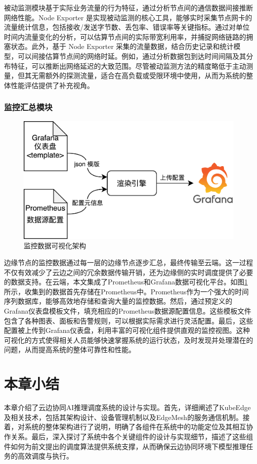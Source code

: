 被动监测模块基于实际业务流量的行为特征，通过分析节点间的通信数据间接推断网络性能。Node Exporter 是实现被动监测的核心工具，能够实时采集节点网卡的流量统计信息，包括接收/发送字节数、丢包率、错误率等关键指标。通过对单位时间内流量变化的分析，可以估算节点间的实际带宽利用率，并捕捉网络链路的拥塞状态。此外，基于 Node Exporter 采集的流量数据，结合历史记录和统计模型，可以间接估算节点间的网络时延。例如，通过分析数据包到达时间间隔及其分布特征，可以推断出网络延迟的大致范围。尽管被动监测方法的精度略低于主动测量，但其无需额外的探测流量，适合在高负载或受限环境中使用，从而为系统的整体性能评估提供了补充视角。

\subsubsection{监控汇总模块}

\begin{figure}[ht]
  \centering
  \includegraphics[width=0.65\linewidth]{pics/4-12grafana.png}
  \caption{监控数据可视化架构}
  \label{fig:4-12grafana}
\end{figure}

边缘节点的监控数据通过每一层的边缘节点逐步汇总，最终传输至云端。这一过程不仅有效减少了云边之间的冗余数据传输开销，还为边缘侧的实时调度提供了必要的数据支持。在云端，本文集成了Prometheus和Grafana数据可视化平台。如图\ref{fig:4-12grafana}所示，收集到的数据首先存储在Prometheus中。Prometheus作为一个强大的时间序列数据库，能够高效地存储和查询大量的监控数据。然后，通过预定义的Grafana仪表盘模板文件，填充相应的Prometheus数据源配置信息。这些模板文件包含了各种图表、面板和告警规则，可以根据实际需求进行灵活配置。最后，这些配置被上传到Grafana仪表盘，利用丰富的可视化组件提供直观的监控视图。这种可视化的方式使得相关人员能够快速掌握系统的运行状态，及时发现并处理潜在的问题，从而提高系统的整体可靠性和性能。

\section{本章小结}

本章介绍了云边协同AI推理调度系统的设计与实现。首先，详细阐述了KubeEdge及相关技术，包括其架构设计、设备管理机制以及EdgeMesh的服务通信机制。接着，对系统的整体架构进行了说明，明确了各组件在系统中的功能定位及其相互协作关系。最后，深入探讨了系统中各个关键组件的设计与实现细节，描述了这些组件如何为前文提出的调度算法提供系统支撑，从而确保云边协同环境下模型推理任务的高效调度与执行。


